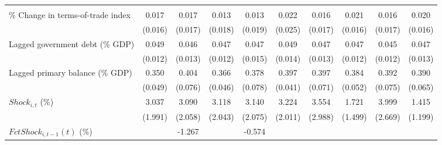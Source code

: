 {\begin{tabular}{l*{9}{c}}
                    &                     &                     &                     &                     &                     &                     &                     &                     &                     \\
\addlinespace
\% Change in terms-of-trade index&       0.017         &       0.017         &       0.013         &       0.013         &       0.022         &       0.016         &       0.021         &       0.016         &       0.020         \\
                    &     (0.016)         &     (0.017)         &     (0.018)         &     (0.019)         &     (0.025)         &     (0.017)         &     (0.016)         &     (0.017)         &     (0.016)         \\
\addlinespace
Lagged government debt (\% GDP)&       0.049\sym{***}&       0.046\sym{***}&       0.047\sym{***}&       0.047\sym{***}&       0.049\sym{***}&       0.047\sym{***}&       0.047\sym{***}&       0.045\sym{***}&       0.047\sym{***}\\
                    &     (0.012)         &     (0.013)         &     (0.012)         &     (0.015)         &     (0.014)         &     (0.013)         &     (0.012)         &     (0.012)         &     (0.013)         \\
\addlinespace
Lagged primary balance (\% GDP)&       0.350\sym{***}&       0.404\sym{***}&       0.366\sym{***}&       0.378\sym{***}&       0.397\sym{***}&       0.397\sym{***}&       0.384\sym{***}&       0.392\sym{***}&       0.390\sym{***}\\
                    &     (0.049)         &     (0.076)         &     (0.046)         &     (0.078)         &     (0.041)         &     (0.071)         &     (0.052)         &     (0.075)         &     (0.065)         \\
\addlinespace
$ Shock_{i,t}$ (\%) &       3.037         &       3.090         &       3.118         &       3.140         &       3.224         &       3.554         &       1.721         &       3.999         &       1.415         \\
                    &     (1.991)         &     (2.058)         &     (2.043)         &     (2.075)         &     (2.011)         &     (2.988)         &     (1.499)         &     (2.669)         &     (1.199)         \\
\addlinespace
$ FctShock_{i,t-1}(t)$ (\%)&                     &      -1.267         &                     &      -0.574         &                     &                     &                     &                     &                     \\

\end{tabular}}
